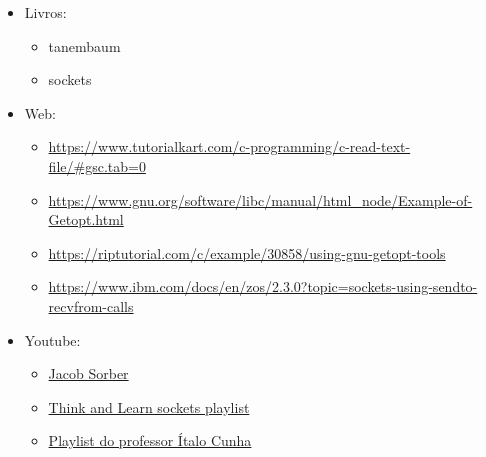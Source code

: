 \documentclass{article}
\begin{document}
\begin{itemize}
    \item Livros:
          \begin{itemize}
              \item tanembaum
              \item sockets
          \end{itemize}

    \item Web:
          \begin{itemize}
              \item
                    \url{https://www.tutorialkart.com/c-programming/c-read-text-file/#gsc.tab=0}
              \item
                    \url{https://www.gnu.org/software/libc/manual/html_node/Example-of-Getopt.html}
              \item
                    \url{https://riptutorial.com/c/example/30858/using-gnu-getopt-tools}
              \item 
                    \url{https://www.ibm.com/docs/en/zos/2.3.0?topic=sockets-using-sendto-recvfrom-calls}
          \end{itemize}

    \item Youtube:
          \begin{itemize}
              \item \href{https://www.youtube.com/@JacobSorber}{Jacob Sorber}
              \item \href{https://www.youtube.com/watch?v=_lQ-3S4fJ0U&list=PLPyaR5G9aNDvs6TtdpLcVO43_jvxp4emI}{Think and Learn sockets playlist}
              \item \href{https://www.youtube.com/watch?v=tJ3qNtv0HVs&t=2s}{Playlist do professor Ítalo Cunha}
            \end{itemize}

\end{itemize}
\end{document}
